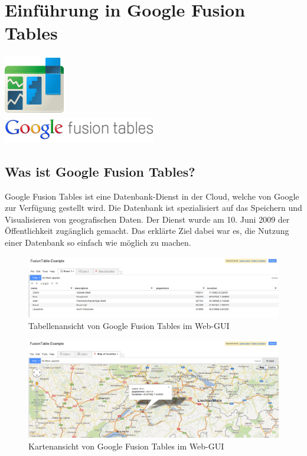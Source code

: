\chapter{Einführung in Google Fusion Tables}
\label{einfuehrung}

\begin{center}
\includegraphics[scale=0.8]{images/einfuehrung/gft-logo} \\[0.3cm]
\includegraphics[scale=0.6]{images/einfuehrung/gft-text-logo}
\end{center}

\section{Was ist Google Fusion Tables?}
Google Fusion Tables ist eine Datenbank-Dienst in der \gls{Cloud}, welche von Google zur Verfügung gestellt wird.  Die Datenbank ist spezialisiert auf das Speichern und Visualisieren von geografischen Daten.
Der Dienst wurde am 10. Juni 2009 der Öffentlichkeit zugänglich gemacht\cite{fusion-table-announce}. Das erklärte Ziel dabei war es, die Nutzung einer Datenbank so einfach wie möglich zu machen.

\begin{figure}[!ht]
	\centering
	\includegraphics[width=\textwidth]{images/einfuehrung/gft-webgui-table}
	\caption{Tabellenansicht von Google Fusion Tables im Web-GUI}
	\label{gft-webgui-table}
\end{figure}

\begin{figure}[!ht]
	\centering
	\includegraphics[width=\textwidth]{images/einfuehrung/gft-webgui-map}
	\caption{Kartenansicht von Google Fusion Tables im Web-GUI}
	\label{gft-webgui-map}
\end{figure}

